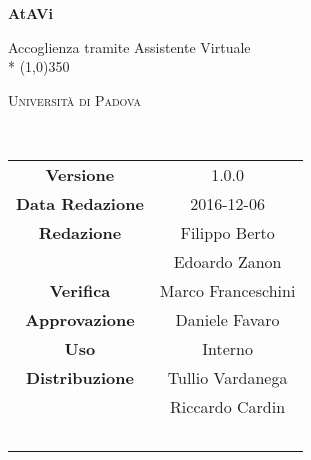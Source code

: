 \documentclass[a4paper,12pt]{article}
\author{Nome Autore}
\date{aaaa/mm/gg}
\begin{document}
\begin{titlepage}
	\centering
	{\huge\bfseries AtAVi\par}
	Accoglienza tramite Assistente Virtuale \\*
	\line(1,0){350} \\
	{\scshape\LARGE Università di Padova \par}
	\vspace{1cm}
	{\scshape\Large \normediprogettoi\ \par}
	\logo
	\newpage
	\begin{tabular}{c|c}
		{\hfill \textbf{Versione}} 			& 1.0.0								\\
		{\hfill\textbf{Data Redazione}} 	& 2016-12-06 						\\
		{\hfill\textbf{Redazione}} 			& Filippo Berto \\ & Edoardo Zanon \\
		{\hfill\textbf{Verifica}} 			& Marco Franceschini 				\\
		{\hfill\textbf{Approvazione}} 		& Daniele Favaro					\\
		{\hfill\textbf{Uso}} 				& Interno 							\\
		{\hfill\textbf{Distribuzione}} 		& Tullio Vardanega \\ & Riccardo Cardin \\ & \prop\	\\
	\end{tabular}
\end{titlepage}
	
	\pagestyle{myfront}
	\newpage
		
	\newpage
		\tableofcontents
	
	\label{LastFrontPage}	
		\newpage	
		\pagestyle{mymain}		
			
		\newpage
			
		\newpage		
			
		\newpage		
			
		
	\label{LastPage}
\end{document}

